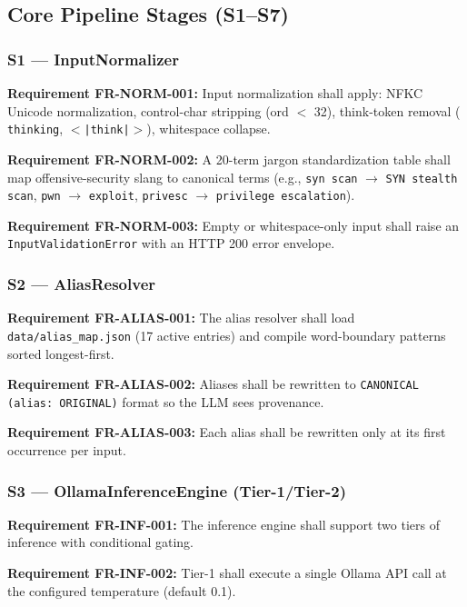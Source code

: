 ﻿\documentclass[10pt,journal,onecolumn]{IEEEtran}
\newcommand{\reqid}[1]{\textbf{#1}}
\begin{document}
\subsection{Core Pipeline Stages (S1--S7)}

\subsubsection{S1 --- InputNormalizer}
\reqid{Requirement FR-NORM-001:} Input normalization shall apply: NFKC Unicode normalization, control-char stripping (ord $<$ 32), think-token removal (\texttt{ thinking}, \texttt{$<$|think|$>$}), whitespace collapse.

\reqid{Requirement FR-NORM-002:} A 20-term jargon standardization table shall map offensive-security slang to canonical terms (e.g., \texttt{syn scan} $\rightarrow$ \texttt{SYN stealth scan}, \texttt{pwn} $\rightarrow$ \texttt{exploit}, \texttt{privesc} $\rightarrow$ \texttt{privilege escalation}).

\reqid{Requirement FR-NORM-003:} Empty or whitespace-only input shall raise an \texttt{InputValidationError} with an HTTP 200 error envelope.

\subsubsection{S2 --- AliasResolver}
\reqid{Requirement FR-ALIAS-001:} The alias resolver shall load \texttt{data/alias\_map.json} (17 active entries) and compile word-boundary patterns sorted longest-first.

\reqid{Requirement FR-ALIAS-002:} Aliases shall be rewritten to \texttt{CANONICAL (alias: ORIGINAL)} format so the LLM sees provenance.

\reqid{Requirement FR-ALIAS-003:} Each alias shall be rewritten only at its first occurrence per input.

\subsubsection{S3 --- OllamaInferenceEngine (Tier-1/Tier-2)}
\reqid{Requirement FR-INF-001:} The inference engine shall support two tiers of inference with conditional gating.

\reqid{Requirement FR-INF-002:} Tier-1 shall execute a single Ollama API call at the configured temperature (default 0.1).
\end{document}
